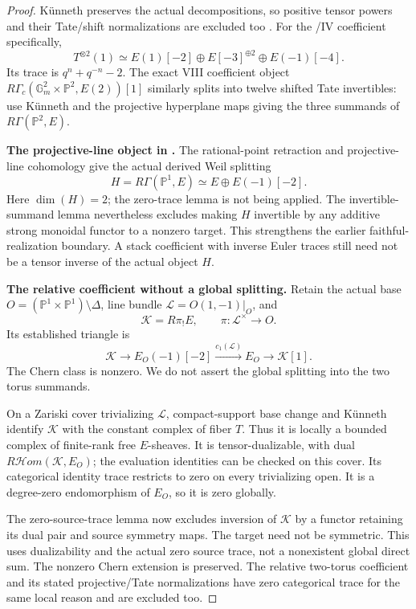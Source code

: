 \begin{proof}
K\"unneth preserves the actual decompositions,
so positive tensor powers and their Tate/shift
normalizations are excluded too
\cite[Theorem~22.1 and Remark~22.3(b)--(d),
pp.~135--136, with the following \(\ell\)-adic passage]{Milne}.
For the /IV coefficient specifically,
\[
 T^{\otimes2}(1)\simeq
 E(1)[-2]\oplus E[-3]^{\oplus2}\oplus E(-1)[-4].
\]
Its trace is \(q^n+q^{-n}-2\).
The exact VIII coefficient object
\(R\Gamma_c(\mathbb G_m^2\times\mathbb P^2,E(2))[1]\)
similarly splits into twelve shifted Tate
invertibles: use K\"unneth and the projective
hyperplane maps giving the three summands of
\(R\Gamma(\mathbb P^2,E)\).

\par\smallskip\noindent\textbf{The projective-line object in .}\quad
The rational-point retraction and projective-line
cohomology give the actual derived Weil splitting
\[
 H=R\Gamma(\mathbb P^1,E)
       \simeq E\oplus E(-1)[-2].
\]
Here \(\dim(H)=2\); the zero-trace lemma is not
being applied. The invertible-summand lemma
nevertheless excludes making \(H\) invertible
by any additive strong monoidal functor to a
nonzero target.
This strengthens the earlier faithful-realization
boundary. A stack coefficient with inverse
Euler traces still need not be a tensor inverse
of the actual object \(H\).

\par\smallskip\noindent\textbf{The relative coefficient without a global splitting.}\quad
Retain the actual  base
\(O=(\mathbb P^1\times\mathbb P^1)\setminus\Delta\),
line bundle \(\mathcal L=O(1,-1)|_O\), and
\[
 \mathcal K=R\pi_!E,\qquad
 \pi:\mathcal L^\times\to O.
\]
Its established triangle is
\[
 \mathcal K\longrightarrow E_O(-1)[-2]
   \xrightarrow{c_1(\mathcal L)}E_O
   \longrightarrow\mathcal K[1].
\]
The Chern class is nonzero. We do not assert
the global splitting into the two torus summands.

On a Zariski cover trivializing \(\mathcal L\),
compact-support base change and K\"unneth identify
\(\mathcal K\) with the constant complex of fiber \(T\).
Thus it is locally a bounded complex of finite-rank
free \(E\)-sheaves. It is tensor-dualizable, with
dual \(R\mathcal Hom(\mathcal K,E_O)\);
the evaluation identities can be checked on this cover.
Its categorical identity trace restricts to zero
on every trivializing open. It is a degree-zero
endomorphism of \(E_O\), so it is zero globally.

The zero-source-trace lemma now excludes inversion
of \(\mathcal K\) by a functor retaining its
dual pair and source symmetry maps. The target
need not be symmetric.
This uses dualizability and the actual zero
source trace, not a nonexistent global direct sum.
The nonzero Chern extension is preserved.
The relative two-torus coefficient and its stated
projective/Tate normalizations have zero categorical
trace for the same local reason and are excluded too.
\end{proof}

